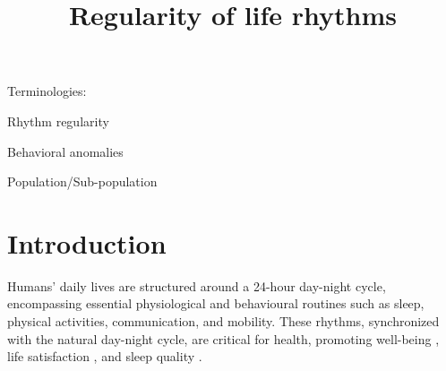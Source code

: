\documentclass[pdflatex,sn-vancouver,Numbered]{bst/sn-jnl}%
\theoremstyle{thmstyleone}%
\theoremstyle{thmstyletwo}%
\theoremstyle{thmstylethree}%
\begin{document}
\title[Article Title]{Regularity of life rhythms}


\author*[1]{ }


\author[1]{ }




\abstract{}

\keywords{}


\maketitle

Terminologies:

Rhythm regularity

Behavioral anomalies

Population/Sub-population

\section{Introduction}\label{sec1}

Humans' daily lives are structured around a 24-hour day-night cycle, encompassing essential physiological and behavioural routines such as sleep, physical activities, communication, and mobility. These rhythms, synchronized with the natural day-night cycle, are critical for health, promoting well-being \cite{heintzelman2019routines}, life satisfaction \cite{margraf2016social}, and sleep quality \cite{carney2006daily}. 

\end{document}
